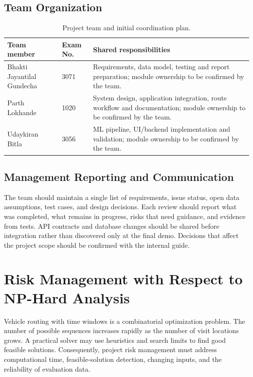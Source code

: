 \documentclass[12pt,a4paper,oneside]{report}
\newcommand{\studentone}{Bhakti Jayantilal Gundecha}
\newcommand{\studenttwo}{Parth Lokhande}
\newcommand{\studentthree}{Udaykiran Bitla}
\newcommand{\exone}{3071}
\newcommand{\extwo}{1020}
\newcommand{\exthree}{3056}
\begin{document}
\subsection{Team Organization}
\begin{table}[htbp]
\centering
\begin{tabularx}{\textwidth}{p{48mm}p{43mm}X}
\toprule
\textbf{Team member} & \textbf{Exam No.} & \textbf{Shared responsibilities}\\
\midrule
\studentone & \exone & Requirements, data model, testing and report preparation; module ownership to be confirmed by the team.\\
\studenttwo & \extwo & System design, application integration, route workflow and documentation; module ownership to be confirmed by the team.\\
\studentthree & \exthree & ML pipeline, UI/backend implementation and validation; module ownership to be confirmed by the team.\\
\bottomrule
\end{tabularx}
\caption{Project team and initial coordination plan.}
\end{table}

\subsection{Management Reporting and Communication}
The team should maintain a single list of requirements, issue status, open data assumptions, test cases, and design decisions. Each review should report what was completed, what remains in progress, risks that need guidance, and evidence from tests. API contracts and database changes should be shared before integration rather than discovered only at the final demo. Decisions that affect the project scope should be confirmed with the internal guide.

\section{Risk Management with Respect to NP-Hard Analysis}
Vehicle routing with time windows is a combinatorial optimization problem. The number of possible sequences increases rapidly as the number of visit locations grows. A practical solver may use heuristics and search limits to find good feasible solutions. Consequently, project risk management must address computational time, feasible-solution detection, changing inputs, and the reliability of evaluation data.
\end{document}
